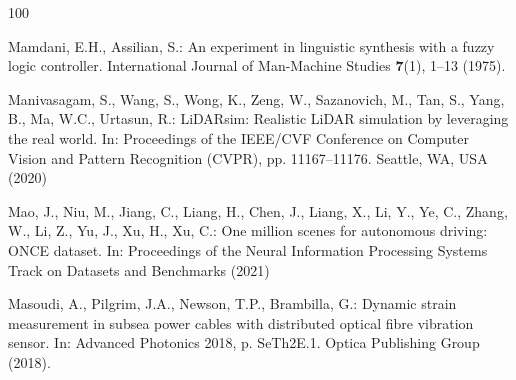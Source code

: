 \documentclass[graybox,envcountchap]{style/SNmono}
\begin{document}
\begin{thebibliography}{100}

Mamdani, E.H., Assilian, S.: An experiment in linguistic synthesis with a fuzzy
  logic controller.
\newblock International Journal of Man-Machine Studies \textbf{7}(1), 1--13
  (1975).
\newblock {}


{\color{red} 
Manivasagam, S., Wang, S., Wong, K., Zeng, W., Sazanovich, M., Tan, S., Yang,
  B., Ma, W.C., Urtasun, R.: {LiDARsim}: Realistic {LiDAR} simulation by
  leveraging the real world.
\newblock In: Proceedings of the IEEE/CVF Conference on Computer Vision and
  Pattern Recognition (CVPR), pp. 11167--11176. Seattle, WA, USA (2020)

\par}
{\color{red} 
Mao, J., Niu, M., Jiang, C., Liang, H., Chen, J., Liang, X., Li, Y., Ye, C.,
  Zhang, W., Li, Z., Yu, J., Xu, H., Xu, C.: One million scenes for autonomous
  driving: {ONCE} dataset.
\newblock In: Proceedings of the Neural Information Processing Systems Track on
  Datasets and Benchmarks (2021)

\par}

Masoudi, A., Pilgrim, J.A., Newson, T.P., Brambilla, G.: Dynamic strain
  measurement in subsea power cables with distributed optical fibre vibration
  sensor.
\newblock In: Advanced Photonics 2018, p. SeTh2E.1. Optica Publishing Group
  (2018).
\newblock {}




\end{thebibliography}
\end{document}
